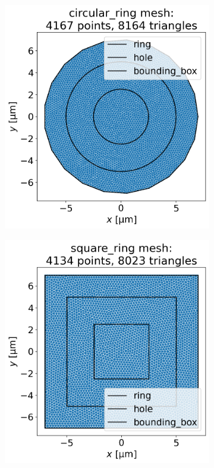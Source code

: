\documentclass[preprint,12pt]{elsarticle}
\begin{document}
\begin{figure}
\centering
\begin{subfigure}{.45\textwidth}
  \centering
  \includegraphics[width=\linewidth]{examples/images/ring/circular_ring_mesh.png}
  \label{fig:circular_ring_mesh}
\end{subfigure}%
\begin{subfigure}{.45\textwidth}
  \centering
  \includegraphics[width=\linewidth]{examples/images/ring/square_ring_mesh.png}

\end{subfigure}
\end{figure}
\end{document}
